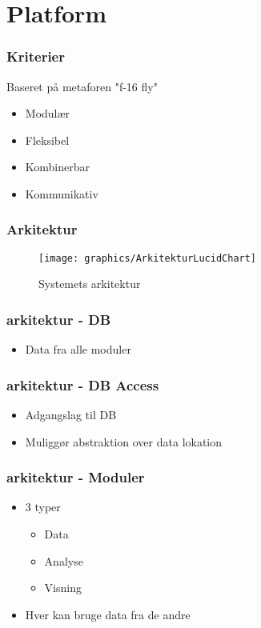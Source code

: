 \section{Platform}

\begin{frame}
\frametitle{Kriterier}
Baseret på metaforen "f-16 fly"
\begin{itemize}
\item Modulær
\item Fleksibel
\item Kombinerbar
\item Kommunikativ
\end{itemize}
\end{frame}

\begin{frame}
\frametitle{Arkitektur}
\begin{figure}[h]
	\centering						%
	\texttt{[image: graphics/ArkitekturLucidChart]}
	\caption{Systemets arkitektur}
  \label{arkitektur_udkast_1}
\end{figure}
\end{frame}

\begin{frame}
\frametitle{arkitektur - DB}
\begin{itemize}
\item Data fra alle moduler
\end{itemize}
\end{frame}

\begin{frame}
\frametitle{arkitektur - DB Access}
\begin{itemize}
\item Adgangslag til DB
\item Muliggør abstraktion over data lokation
\end{itemize}
\end{frame}

\begin{frame}
\frametitle{arkitektur - Moduler}
\begin{itemize}
\item 3 typer
\begin{itemize}
\item Data
\item Analyse
\item Visning
\end{itemize}
\item Hver kan bruge data fra de andre
\end{itemize}
\end{frame}

